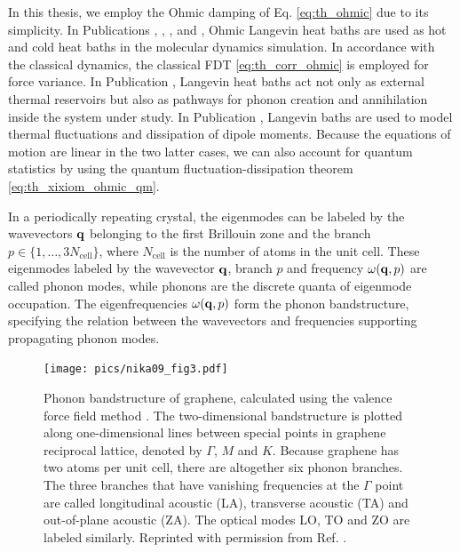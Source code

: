 In this thesis, we employ the Ohmic damping of Eq. \eqref{eq:th_ohmic} due to its simplicity. In Publications , , , and , Ohmic Langevin heat baths are used as hot and cold heat baths in the molecular dynamics simulation. In accordance with the classical dynamics, the classical FDT \eqref{eq:th_corr_ohmic} is employed for force variance. In Publication , Langevin heat baths act not only as external thermal reservoirs but also as pathways for phonon creation and annihilation inside the system under study. In Publication , Langevin baths are used to model thermal fluctuations and dissipation of dipole moments. Because the equations of motion are linear in the two latter cases, we can also account for quantum statistics by using the quantum fluctuation-dissipation theorem \eqref{eq:th_xixiom_ohmic_qm}.

\iffalse

In a periodically repeating crystal, the eigenmodes can be labeled by the wavevectors $\mathbf{q}$ belonging to the first Brillouin zone \cite{ziman} and the branch $p \in \{1,\dots,3N_{\textrm{cell}}\}$, where $N_{\textrm{cell}}$ is the number of atoms in the unit cell. These eigenmodes labeled by the wavevector $\mathbf{q}$, branch $p$ and frequency $\omega(\mathbf{q},p)$ are called phonon modes, while phonons are the discrete quanta of eigenmode occupation. The eigenfrequencies $\omega(\mathbf{q},p)$ form the phonon bandstructure, specifying the relation between the wavevectors and frequencies supporting propagating phonon modes. 

\begin{figure}
\begin{center}
 \texttt{[image: pics/nika09\_fig3.pdf]}
 \caption{Phonon bandstructure of graphene, calculated using the valence force field method \cite{nika09}. The two-dimensional bandstructure is plotted along one-dimensional lines between special points in graphene reciprocal lattice, denoted by $\Gamma$, $M$ and $K$. Because graphene has two atoms per unit cell, there are altogether six phonon branches. The three branches that have vanishing frequencies at the $\Gamma$ point are called longitudinal acoustic (LA), transverse acoustic (TA) and out-of-plane acoustic (ZA). The optical modes LO, TO and ZO are labeled similarly. Reprinted with permission from Ref. \cite{nika09}.}
\label{fig:th_nika}
\end{center}
\end{figure} 


